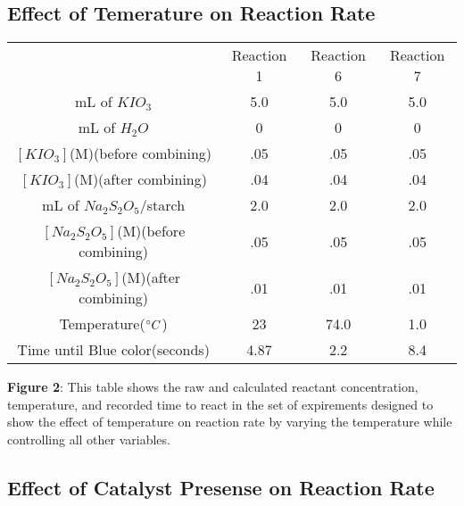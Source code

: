 \documentclass{article}
\begin{document}
\subsection{Effect of Temerature on Reaction Rate}
\begin{table}[H]
    \begin{center}
    \begin{tabularx}{400pt}{c|c|c|c} & Reaction 1 & Reaction 6 & Reaction 7 \\
    mL of $KIO_3$ & 5.0 & 5.0 & 5.0 \\
    mL of $H_2O$ & 0 & 0 & 0 \\
    $[KIO_3]$(M)(before combining) & .05 & .05 & .05 \\
    $[KIO_3]$(M)(after combining) & .04 & .04 & .04 \\
    mL of $Na_2S_2O_5$/starch & 2.0 & 2.0 & 2.0 \\
    $[Na_2S_2O_5]$(M)(before combining) & .05 & .05 & .05 \\
    $[Na_2S_2O_5]$(M)(after combining) & .01 & .01 & .01 \\
    Temperature($\degree C$) & 23 & 74.0 & 1.0\\
    Time until Blue color(seconds) & 4.87 & 2.2 & 8.4 \\

    \end{tabularx}
    \end{center}
\end{table}
\textbf{Figure 2}: This table shows the raw and calculated reactant concentration, temperature, and recorded time to react in the set of expirements designed to show the effect of temperature on reaction rate by varying the temperature while controlling all other variables.
\subsection{Effect of Catalyst Presense on Reaction Rate}
\end{document}
